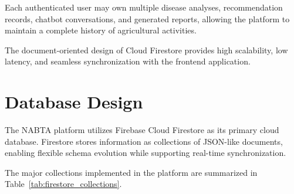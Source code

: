 Each authenticated user may own multiple disease analyses, recommendation records, chatbot conversations, and generated reports, allowing the platform to maintain a complete history of agricultural activities.

The document-oriented design of Cloud Firestore provides high scalability, low latency, and seamless synchronization with the frontend application.

\section{Database Design}
\label{sec:database_design}

The NABTA platform utilizes Firebase Cloud Firestore as its primary cloud database. Firestore stores information as collections of JSON-like documents, enabling flexible schema evolution while supporting real-time synchronization.

The major collections implemented in the platform are summarized in Table~\ref{tab:firestore_collections}.

